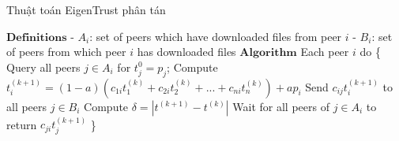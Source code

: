 \begin{algorithm}
  \caption{Thuật toán EigenTrust phân tán}
  \label{alg:distributed-eigentrust-algorithm}
  \begin{algorithmic}
    \State $\textbf{Definitions}$
    \State \hspace{1em}- $A_i$: set of peers which have downloaded files from peer $i$
    \State \hspace{1em}- $B_i$: set of peers from which peer $i$ has downloaded files
    \State $\textbf{Algorithm}$
    \State Each peer $i$ do \{
    \State Query all peers $j \in A_i$ for $t_j^{0} = p_j$;
    \Repeat
    \State Compute $t_i^{(k+1)} = (1 - a)(c_{1i}t_1^{(k)} + c_{2i}t_2^{(k)} + ... + c_{ni}t_n^{(k)}) + ap_i$
    \State Send $c_{ij}t_i^{(k+1)}$ to all peers $j \in B_i$
    \State Compute $\delta = | t^{(k+1)} - t^{(k)} |$
    \State Wait for all peers of $j \in A_i$ to return $c_{ji}t_j^{(k+1)}$
    \Until{$\delta < \epsilon$}
    \State \}
  \end{algorithmic}
\end{algorithm}